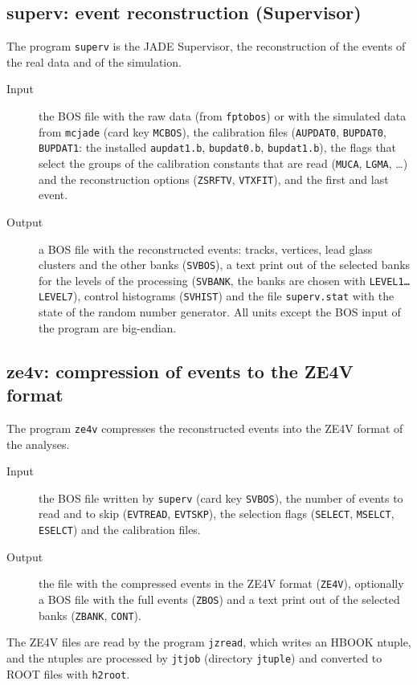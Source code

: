\subsection{superv: event reconstruction (Supervisor)}
The program \texttt{superv} is the JADE Supervisor, the reconstruction of the events of the real data and of the
simulation.
\begin{description}
\item[Input] the BOS file with the raw data (from \texttt{fptobos}) or with the simulated data from \texttt{mcjade}
(card key \texttt{MCBOS}), the calibration files (\texttt{AUPDAT0}, \texttt{BUPDAT0}, \texttt{BUPDAT1}: the
installed \texttt{aupdat1.b}, \texttt{bupdat0.b}, \texttt{bupdat1.b}), the flags that select the groups of the
calibration constants that are read (\texttt{MUCA}, \texttt{LGMA}, \dots) and the reconstruction options
(\texttt{ZSRFTV}, \texttt{VTXFIT}), and the first and last event.
\item[Output] a BOS file with the reconstructed events: tracks, vertices, lead glass clusters and the other banks
(\texttt{SVBOS}), a text print out of the selected banks for the levels of the processing (\texttt{SVBANK}, the banks are
chosen with \texttt{LEVEL1\dots LEVEL7}), control histograms (\texttt{SVHIST}) and the file \texttt{superv.stat} with the
state of the random number generator. All units except the BOS input of the program are big-endian.
\end{description}

\subsection{ze4v: compression of events to the ZE4V format}
\label{sec:ze4v}
The program \texttt{ze4v} compresses the reconstructed events into the ZE4V format of the analyses.
\begin{description}
\item[Input] the BOS file written by \texttt{superv} (card key \texttt{SVBOS}), the number of events to read and to
skip (\texttt{EVTREAD}, \texttt{EVTSKP}), the selection flags (\texttt{SELECT}, \texttt{MSELCT}, \texttt{ESELCT}) and the
calibration files.
\item[Output] the file with the compressed events in the ZE4V format (\texttt{ZE4V}), optionally a BOS file with the full
events (\texttt{ZBOS}) and a text print out of the selected banks (\texttt{ZBANK}, \texttt{CONT}).
\end{description}
The ZE4V files are read by the program \texttt{jzread}, which writes an HBOOK ntuple, and the ntuples are processed
by \texttt{jtjob} (directory \texttt{jtuple}) and converted to ROOT files with \texttt{h2root}.

